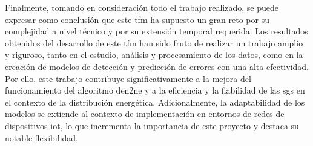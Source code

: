 Finalmente, tomando en consideración todo el trabajo realizado, se puede expresar como conclusión que este \gls{tfm} ha supuesto un gran reto por su complejidad a nivel técnico y por su extensión temporal requerida. Los resultados obtenidos del desarrollo de este \gls{tfm} han sido fruto de realizar un trabajo amplio y riguroso, tanto en el estudio, análisis y procesamiento de los datos, como en la creación de modelos de detección y predicción de errores con una alta efectividad. Por ello, este trabajo contribuye significativamente a la mejora del funcionamiento del algoritmo \gls{den2ne} y a la eficiencia y la fiabilidad de las \gls{sg}s en el contexto de la distribución energética. Adicionalmente, la adaptabilidad de los modelos se extiende al contexto de implementación en entornos de redes de dispositivos \gls{iot}, lo que incrementa la importancia de este proyecto y destaca su notable flexibilidad.

